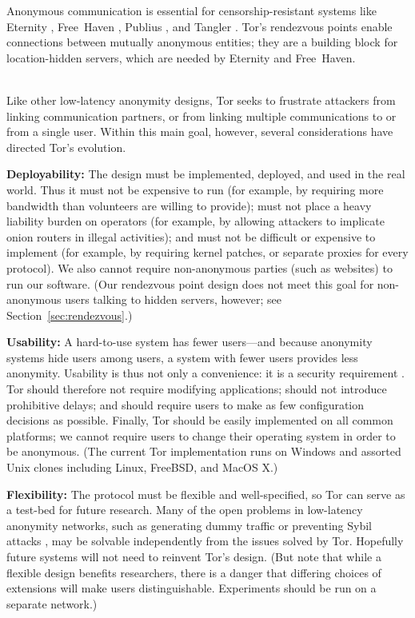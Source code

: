 \documentclass[times,10pt,twocolumn]{article}
\begin{document}
Anonymous communication is essential for censorship-resistant
systems like Eternity \cite{eternity}, Free~Haven \cite{freehaven-berk},
Publius \cite{publius}, and Tangler \cite{tangler}. Tor's rendezvous
points enable connections between mutually anonymous entities; they
are a building block for location-hidden servers, which are needed by
Eternity and Free~Haven.


\label{sec:assumptions}

\\
Like other low-latency anonymity designs, Tor seeks to frustrate
attackers from linking communication partners, or from linking
multiple communications to or from a single user.  Within this
main goal, however, several considerations have directed
Tor's evolution.

\textbf{Deployability:} The design must be implemented,
deployed, and used in the real world.  Thus it
must not be expensive to run (for example, by requiring more bandwidth
than volunteers are willing to provide); must not place a heavy
liability burden on operators (for example, by allowing attackers to
implicate onion routers in illegal activities); and must not be
difficult or expensive to implement (for example, by requiring kernel
patches, or separate proxies for every protocol).  We also cannot
require non-anonymous parties (such as websites)
to run our software.  (Our rendezvous point design does not meet
this goal for non-anonymous users talking to hidden servers,
however; see Section~\ref{sec:rendezvous}.)

\textbf{Usability:} A hard-to-use system has fewer users---and because
anonymity systems hide users among users, a system with fewer users
provides less anonymity.  Usability is thus not only a convenience:
it is a security requirement \cite{econymics,back01}. Tor should
therefore not
require modifying applications; should not introduce prohibitive delays;
and should require users to make as few configuration decisions
as possible.  Finally, Tor should be easily implemented on all common
platforms; we cannot require users to change their operating system in order
to be anonymous.  (The current Tor implementation runs on Windows and
assorted Unix clones including Linux, FreeBSD, and MacOS X.)

\textbf{Flexibility:} The protocol must be flexible and well-specified,
so Tor can serve as a test-bed for future research.
Many of the open problems in low-latency anonymity
networks, such as generating dummy traffic or preventing Sybil attacks
\cite{sybil}, may be solvable independently from the issues solved by
Tor. Hopefully future systems will not need to reinvent Tor's design.
(But note that while a flexible design benefits researchers,
there is a danger that differing choices of extensions will make users
distinguishable. Experiments should be run on a separate network.)
\end{document}
